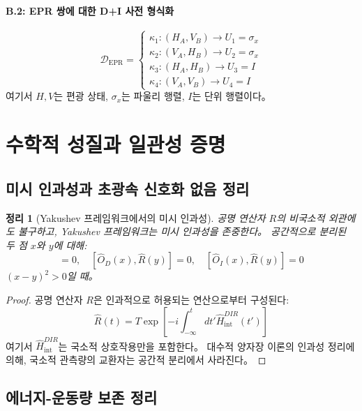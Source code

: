 \documentclass[11pt,a4paper]{article}
\newtheorem{theorem}{정리}
\begin{document}
\paragraph{B.2: EPR 쌍에 대한 \protect\mbox{D+I} 사전 형식화}
\begin{equation}
\mathcal{D}_{\text{EPR}} = 
\begin{cases}
	\kappa_1: (H_A, V_B) \to U_1 = \sigma_x \\
	\kappa_2: (V_A, H_B) \to U_2 = \sigma_x \\
	\kappa_3: (H_A, H_B) \to U_3 = I \\
	\kappa_4: (V_A, V_B) \to U_4 = I
\end{cases}
\end{equation}
여기서 $H,V$는 편광 상태, $\sigma_x$는 파울리 행렬, $I$는 단위 행렬이다。

\section{수학적 성질과 일관성 증명}
\subsection{미시 인과성과 초광속 신호화 없음 정리}

\begin{theorem}[Yakushev 프레임워크에서의 미시 인과성]
공명 연산자 $R$의 비국소적 외관에도 불구하고, Yakushev 프레임워크는 미시 인과성을 존중한다。 공간적으로 분리된 두 점 $x$와 $y$에 대해:
\begin{equation}
	[\hat{O}_D(x), \hat{O}_I(y)] = 0, \quad [\hat{O}_D(x), \hat{R}(y)] = 0, \quad [\hat{O}_I(x), \hat{R}(y)] = 0
\end{equation}
$(x-y)^2 > 0$일 때。
\end{theorem}

\begin{proof}
공명 연산자 $R$은 인과적으로 허용되는 연산으로부터 구성된다:
\begin{equation}
	\hat{R}(t) = T \exp\left[ -i \int_{-\infty}^t dt' \hat{H}_{\text{int}}^{DIR}(t') \right]
\end{equation}
여기서 $\hat{H}_{\text{int}}^{DIR}$는 국소적 상호작용만을 포함한다。 대수적 양자장 이론의 인과성 정리에 의해, 국소적 관측량의 교환자는 공간적 분리에서 사라진다。
\end{proof}

\subsection{에너지-운동량 보존 정리}
\end{document}
